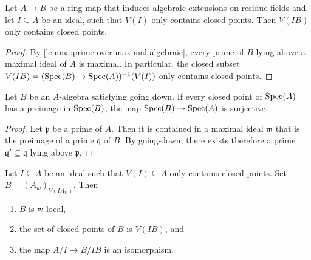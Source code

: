 \begin{lemma}
    Let $A \to B$ be a ring map that induces algebraic extensions on residue fields
    and let $I \subseteq A$ be an ideal, such that $V(I)$ only contains closed points.
    Then $V(IB)$ only contains closed points.
    \label{lemma:preimage-closed-points-algebraic}
\end{lemma}

\begin{proof}
    By \ref{lemma:prime-over-maximal-algebraic}, every prime of $B$ lying above a maximal ideal of $A$
    is maximal. In particular, the closed subset $V(I B) = (\mathrm{Spec}(B) \to \mathrm{Spec}(A))^{-1}(V(I))$ only contains
    closed points.
\end{proof}

\begin{lemma}
    Let $B$ be an $A$-algebra satisfying going down. If every closed point of $\mathrm{Spec}(A)$
    has a preimage in $\mathrm{Spec}(B)$, the map $\mathrm{Spec}(B) \to \mathrm{Spec}(A)$ is surjective.
    \label{lemma:going-down-surjective-of-closed}
\end{lemma}

\begin{proof}
    Let $\mathfrak{p}$ be a prime of $A$. Then it is contained in a maximal ideal $\mathfrak{m}$
    that is the preimage of a prime $\mathfrak{q}$ of $B$. By going-down, there
    exists therefore a prime $\mathfrak{q}' \subseteq \mathfrak{q}$ lying above $\mathfrak{p}$.
\end{proof}

\begin{lemma}
    \label{lemma:closed-closed-points-tilde-w-local}
    Let $I \subseteq A$ be an ideal such that $V(I) \subseteq A$ only contains closed points.
    Set $B = (A_w)_{\widetilde{V(IA_{w})}}$. Then
    \begin{enumerate}
        \item $B$ is w-local,
        \item the set of closed points of $B$ is $V(IB)$, and
        \item the map $A / I \to B / I B$ is an isomorphism.
    \end{enumerate}
\end{lemma}

